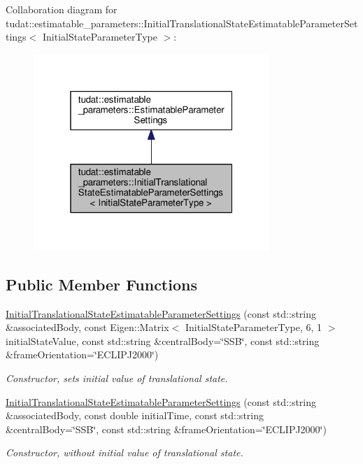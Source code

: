 Collaboration diagram for tudat\+:\+:estimatable\+\_\+parameters\+:\+:Initial\+Translational\+State\+Estimatable\+Parameter\+Settings$<$ Initial\+State\+Parameter\+Type $>$\+:
\nopagebreak
\begin{figure}[H]
\begin{center}
\leavevmode
\includegraphics[width=253pt]{classtudat_1_1estimatable__parameters_1_1InitialTranslationalStateEstimatableParameterSettings__coll__graph}
\end{center}
\end{figure}
\subsection*{Public Member Functions}
\begin{DoxyCompactItemize}
\item 
\hyperlink{classtudat_1_1estimatable__parameters_1_1InitialTranslationalStateEstimatableParameterSettings_a128ec99c66ac26bc1b2be609c3bed16a}{Initial\+Translational\+State\+Estimatable\+Parameter\+Settings} (const std\+::string \&associated\+Body, const Eigen\+::\+Matrix$<$ Initial\+State\+Parameter\+Type, 6, 1 $>$ initial\+State\+Value, const std\+::string \&central\+Body=\char`\"{}S\+SB\char`\"{}, const std\+::string \&frame\+Orientation=\char`\"{}E\+C\+L\+I\+P\+J2000\char`\"{})
\begin{DoxyCompactList}\small\item\em Constructor, sets initial value of translational state. \end{DoxyCompactList}\item 
\hyperlink{classtudat_1_1estimatable__parameters_1_1InitialTranslationalStateEstimatableParameterSettings_ae297bc5744cbc5ae719df0f91205580d}{Initial\+Translational\+State\+Estimatable\+Parameter\+Settings} (const std\+::string \&associated\+Body, const double initial\+Time, const std\+::string \&central\+Body=\char`\"{}S\+SB\char`\"{}, const std\+::string \&frame\+Orientation=\char`\"{}E\+C\+L\+I\+P\+J2000\char`\"{})
\begin{DoxyCompactList}\small\item\em Constructor, without initial value of translational state. \end{DoxyCompactList}\end{DoxyCompactItemize}
